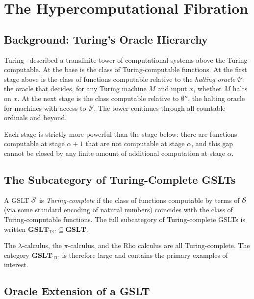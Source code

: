 \chapter{The Hypercomputational Fibration}
\label{sec:fibration}

\section{Background: Turing's Oracle Hierarchy}

Turing~\cite{turing1939} described a transfinite tower of
computational systems above the Turing-computable.
At the base is the class of Turing-computable functions.
At the first stage above is the class of functions computable
relative to the \emph{halting oracle} $\emptyset'$: the oracle that
decides, for any Turing machine $M$ and input $x$, whether $M$
halts on $x$.
At the next stage is the class computable relative to
$\emptyset''$, the halting oracle for machines with access to
$\emptyset'$.
The tower continues through all countable ordinals and beyond.

Each stage is strictly more powerful than the stage below:
there are functions computable at stage $\alpha+1$ that are not
computable at stage $\alpha$, and this gap cannot be closed by
any finite amount of additional computation at stage $\alpha$.

\section{The Subcategory of Turing-Complete GSLTs}

\begin{definition}
A GSLT $\mathcal{S}$ is \emph{Turing-complete} if the class of functions
computable by terms of $\mathcal{S}$ (via some standard encoding of
natural numbers) coincides with the class of Turing-computable
functions.
The full subcategory of Turing-complete GSLTs is written
$\mathbf{GSLT}_{\mathrm{TC}} \subseteq \mathbf{GSLT}$.
\end{definition}

\begin{example}
The $\lambda$-calculus, the $\pi$-calculus, and the Rho calculus
are all Turing-complete.
The category $\mathbf{GSLT}_{\mathrm{TC}}$ is therefore large and
contains the primary examples of interest.
\end{example}

\section{Oracle Extension of a GSLT}

